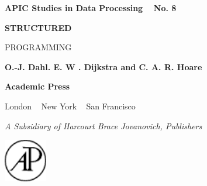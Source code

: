 \pagestyle{empty}
\pagecolor{desertstorm}\afterpage{\nopagecolor}
{
	\color{shadesofmidnight}
	\sffamily
	\textbf{APIC Studies in Data Processing}~~ \textbf{No. 8}
	\vspace*{1.5em}
	
	{
		\Huge\sffamily\bfseries
		STRUCTURED
		\smallskip
		
		PROGRAMMING
	}
	\vspace*{2em}
	
	{
		\large
		\textbf{O.-J. Dahl. E. W . Dijkstra and C. A. R. Hoare}
	}
	
	\vfill
	
	 \begin{minipage}[position]{9cm}
	 	\vspace{-3em}
	 	
	 	\bfseries\Large Academic Press
	 	
	 	London ~ New York ~ San Francisco
	 	
	 	\normalfont\normalsize\sffamily
	 	\textit{A Subsidiary of Harcourt Brace Jovanovich, Publishers}
	\end{minipage}
	\hfill\includegraphics[width=0.14\textwidth]{./images/academic-press.pdf}
}
